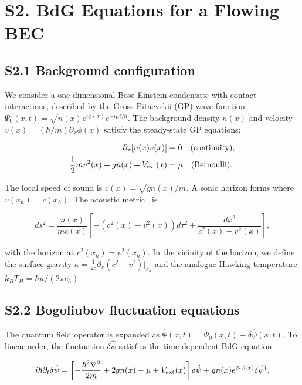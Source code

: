 \documentclass[prd,aps,showpacs,superscriptaddress,twocolumn]{revtex4-2}
\begin{document}
\section{S2. BdG Equations for a Flowing BEC}

\subsection{S2.1 Background configuration}

We consider a one-dimensional Bose-Einstein condensate with contact interactions, described by the Gross-Pitaevskii (GP) wave function $\Psi_0(x,t) = \sqrt{n(x)} e^{i\phi(x)} e^{-i\mu t/\hbar}$. The background density $n(x)$ and velocity $v(x) = (\hbar/m)\partial_x \phi(x)$ satisfy the steady-state GP equations:

\begin{align}
\partial_x [n(x) v(x)] &= 0 \quad \text{(continuity)}, \label{eq:continuity}\\
\frac{1}{2} m v^2(x) + g n(x) + V_{\rm ext}(x) &= \mu \quad \text{(Bernoulli)}. \label{eq:bernoulli}
\end{align}

The local speed of sound is $c(x) = \sqrt{g n(x)/m}$. A sonic horizon forms where $v(x_h) = c(x_h)$. The acoustic metric~\cite{Unruh1981} is

\begin{equation}
ds^2 = \frac{n(x)}{m c(x)} \left[ -(c^2(x) - v^2(x)) d\tau^2 + \frac{dx^2}{c^2(x) - v^2(x)} \right],
\label{eq:acoustic_metric}
\end{equation}

with the horizon at $c^2(x_h) = v^2(x_h)$. In the vicinity of the horizon, we define the surface gravity $\kappa = \frac{1}{2c} \partial_x (c^2 - v^2)|_{x_h}$ and the analogue Hawking temperature $k_B T_H = \hbar \kappa / (2\pi c_h)$.

\subsection{S2.2 Bogoliubov fluctuation equations}

The quantum field operator is expanded as $\hat{\Psi}(x,t) = \Psi_0(x,t) + \delta\hat{\psi}(x,t)$. To linear order, the fluctuation $\delta\hat{\psi}$ satisfies the time-dependent BdG equation:

\begin{equation}
i\hbar \partial_t \delta\hat{\psi} = \left[ -\frac{\hbar^2 \nabla^2}{2m} + 2g n(x) - \mu + V_{\rm ext}(x) \right] \delta\hat{\psi} + g n(x) e^{2i\phi(x)} \delta\hat{\psi}^\dagger.
\label{eq:BdG_time}
\end{equation}
\end{document}
